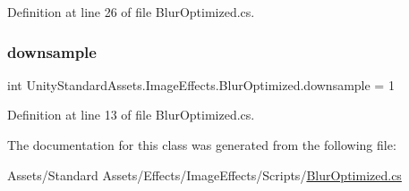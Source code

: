 Definition at line 26 of file Blur\+Optimized.\+cs.

\mbox{\label{class_unity_standard_assets_1_1_image_effects_1_1_blur_optimized_a19e07e0ba50a164698d1b78884dff182}} 
\subsubsection{\texorpdfstring{downsample}{downsample}}
{\footnotesize\ttfamily int Unity\+Standard\+Assets.\+Image\+Effects.\+Blur\+Optimized.\+downsample = 1}



Definition at line 13 of file Blur\+Optimized.\+cs.



The documentation for this class was generated from the following file\+:\begin{DoxyCompactItemize}
\item 
Assets/\+Standard Assets/\+Effects/\+Image\+Effects/\+Scripts/\mbox{\hyperlink{_blur_optimized_8cs}{Blur\+Optimized.\+cs}}\end{DoxyCompactItemize}
